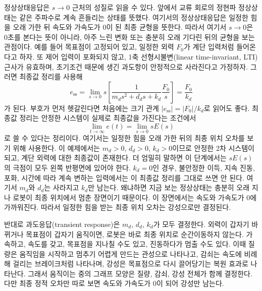 정상상태응답은 $s\to 0$ 근처의 성질로 읽을 수 있다.
앞에서 교류 회로의 정현파 정상상태는 같은 주파수로 계속 흔들리는 상태를 뜻했다.
여기서의 정상상태응답은 일정한 힘을 오래 가한 뒤 속도와 가속도가 0이 된 최종 균형을 뜻한다.
따라서 여기서 $s\to0$은 0초를 본다는 뜻이 아니라, 아주 느린 변화 또는 충분히 오래 기다린 뒤의 균형을 보는 관점이다.
예를 들어 목표점이 고정되어 있고, 일정한 외력 $F_0$가 계단 입력처럼 들어온다고 하자.
또 제어 입력이 포화되지 않고, 1축 선형시불변(linear time-invariant, LTI) 근사가 유효하며, 초기조건 때문에 생긴 과도항이 안정적으로 사라진다고 가정하자.
그러면 최종값 정리를 사용해
\begin{equation}
  e_{\mathrm{ss}}
  =
  \lim_{s\to 0}
  s
  \left[
  \frac{1}{m_d s^2+d_d s+k_d}
  \frac{F_0}{s}
  \right]
  =
  \frac{F_0}{k_d}
\end{equation}
가 된다.
부호가 먼저 헷갈린다면 처음에는 크기 관계 $|e_{\mathrm{ss}}|=|F_0|/k_d$로 읽어도 좋다.
최종값 정리는 안정한 시스템이 실제로 최종값을 가진다는 조건에서
\begin{equation}
  \lim_{t\to\infty} e(t)
  =
  \lim_{s\to 0}sE(s)
\end{equation}
로 쓸 수 있다는 정리이다.
여기서는 일정한 힘을 오래 가한 뒤의 최종 위치 오차를 보기 위해 사용한다.
이 예제에서는 $m_d>0$, $d_d>0$, $k_d>0$이므로 안정한 2차 시스템이 되고, 계단 외력에 대한 최종값이 존재한다.
더 엄밀히 말하면 이 단계에서는 $sE(s)$의 극점이 모두 왼쪽 반평면에 있어야 한다.
$k_d=0$인 경우, 불안정한 이득, 지속 진동, 포화, 시간에 따라 계속 변하는 입력에서는 이 최종값 정리를 그대로 쓰면 안 된다.
여기서 $m_d$와 $d_d$는 사라지고 $k_d$만 남는다.
왜냐하면 지금 보는 정상상태는 충분히 오래 지나 로봇이 최종 위치에서 멈춘 장면이기 때문이다.
이 장면에서는 속도와 가속도가 0에 가까워진다.
따라서 일정한 힘을 받는 최종 위치 오차는 강성으로만 결정된다.

반대로 과도응답(transient response)은 $m_d$, $d_d$, $k_d$가 모두 결정한다.
외력이 갑자기 바뀌거나 목표점이 갑자기 움직이면, 로봇은 바로 최종 위치로 순간이동하지 않는다.
가속하고, 속도를 갖고, 목표점을 지나칠 수도 있고, 진동하다가 멈출 수도 있다.
이때 질량은 움직임을 시작하고 멈추기 어렵게 만드는 관성으로 나타나고, 감쇠는 속도에 비례해 걸리는 브레이크처럼 나타나며, 강성은 목표점으로 다시 끌어당기는 복원 효과로 나타난다.
그래서 움직이는 중의 그래프 모양은 질량, 감쇠, 강성 전체가 함께 결정한다.
다만 최종 정적 오차만 따로 보면 속도와 가속도가 0이 되어 강성만 남는다.

